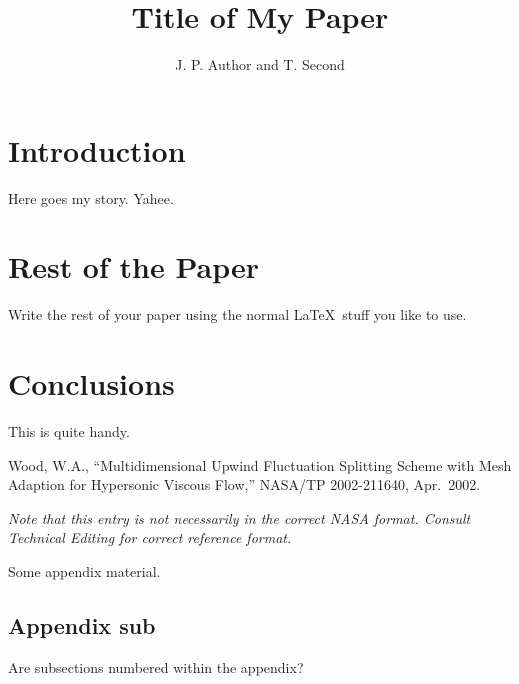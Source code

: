 \documentclass[]             %
{NASA}                       %
\title{Title of My Paper}
\author{J. P. Author and T. Second} %
\begin{document}

\section{Introduction}
Here goes my story.
Yahee.

\section{Rest of the Paper}
Write the rest of your paper using the normal \LaTeX\ stuff you like to
use.

\section{Conclusions}
This is quite handy.

\begin{thebibliography}{WoodTP}
 Wood, W.A., ``Multidimensional Upwind
  Fluctuation Splitting Scheme with Mesh Adaption for Hypersonic Viscous
  Flow,'' NASA/TP 2002-211640, Apr.~2002.
\end{thebibliography}
{\em Note that this entry is not necessarily in the correct NASA
  format. Consult Technical Editing for correct reference format.}

\newpage
\appendix

Some appendix material.

\subsection{Appendix sub}
Are subsections numbered within the appendix?

\end{document}

